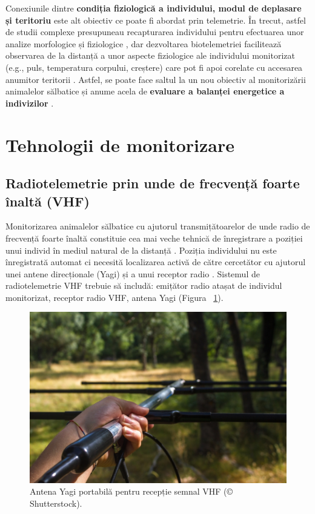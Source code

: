 \documentclass[11pt,onehalfspacing]{elife}
\begin{document}
Conexiunile dintre \textbf{condiția fiziologică a individului, modul de deplasare și teritoriu} este alt obiectiv ce poate fi abordat prin telemetrie. În trecut, astfel de studii complexe presupuneau recapturarea individului pentru efectuarea unor analize morfologice și fiziologice \citep{Hooten2017}, dar dezvoltarea biotelemetriei facilitează observarea de la distanță a unor aspecte fiziologice ale individului monitorizat (e.g., puls, temperatura corpului, creștere) care pot fi apoi corelate cu accesarea anumitor teritorii \citep{wilmers_nickel_bryce_smith_wheat_yovovich_2015}. Astfel, se poate face saltul la un nou obiectiv al monitorizării animalelor sălbatice și anume acela de \textbf{evaluare a balanței energetice a indivizilor} \citep{Hooten2017}. 


\section{Tehnologii de monitorizare}
\subsection{Radiotelemetrie prin unde de frecvență foarte înaltă (VHF)}
Monitorizarea animalelor sălbatice cu ajutorul transmițătoarelor de unde radio de frecvență foarte înaltă constituie cea mai veche tehnică de înregistrare a poziției unui individ în mediul natural de la distanță \citep{White2012}. Poziția individului nu este înregistrată automat ci necesită localizarea activă de către cercetător cu ajutorul unei antene direcționale (Yagi) și a unui receptor radio \citep{Silvy2012}. Sistemul de radiotelemetrie VHF trebuie să includă: emițător radio atașat de individul monitorizat, receptor radio VHF, antena Yagi (Figura ~\ref{fig1}).
\begin{figure}[ht]
\includegraphics[width=\textwidth]{Fig1.jpg}
\caption{Antena Yagi portabilă pentru recepție semnal VHF (© Shutterstock).} \label{fig1}
\end{figure}
\end{document}
